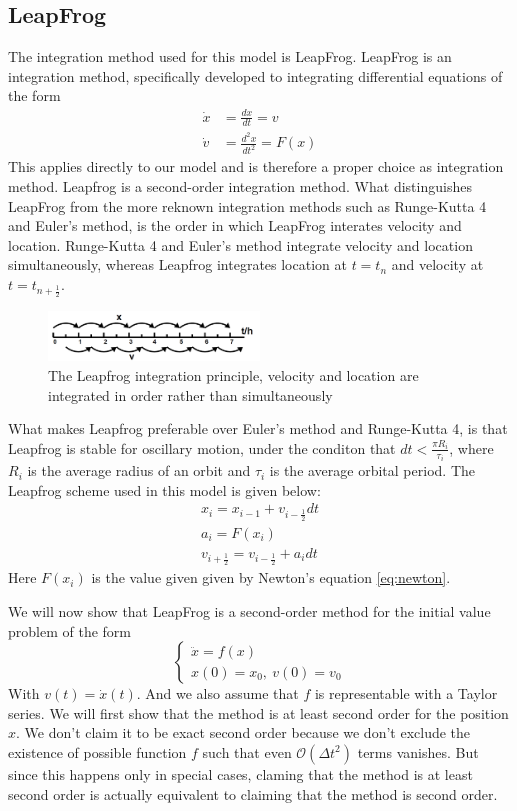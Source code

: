 \subsection{LeapFrog}
The integration method used for this model is LeapFrog. LeapFrog is an integration method, specifically developed to integrating differential equations of the form 
\begin{align*}
	\dot{x}&=\frac{dx}{dt}=v\\
	\dot{v}&=\frac{d^2x}{dt^2}=F(x)
\end{align*}
This applies directly to our model and is therefore a proper choice as integration method. Leapfrog is a second-order integration method. 
What distinguishes LeapFrog from the more reknown integration methods such as Runge-Kutta 4 and Euler's method, is the order in which LeapFrog interates velocity and location. 
Runge-Kutta 4 and Euler's method integrate velocity and location simultaneously, whereas Leapfrog integrates location at \(t=t_n\) and velocity at \(t=t_{n+\frac{1}{2}}\). 
\begin{figure}[H]
  \centering
  \includegraphics[width=0.5\textwidth]{Leapfrog}
  \caption{The Leapfrog integration principle, velocity and location are integrated in order rather than simultaneously}
  \label{fig:leapfrog}
\end{figure}
What makes Leapfrog preferable over Euler's method and Runge-Kutta 4, is that Leapfrog is stable for oscillary motion, under the conditon that \(dt<\frac{\pi R_i}{\tau_i}\), where \(R_i\) is the average radius of an orbit and \(\tau_i\) is the average orbital period\cite{StabLeapfrog}. 
The Leapfrog scheme used in this model is given below:
\begin{align*}
x_i = x_{i-1}+v_{i-\frac{1}{2}} dt\\
a_i= F(x_i)\\
v_{i+\frac{1}{2}}=v_{i-\frac{1}{2}}+ a_idt
\end{align*}
Here \(F(x_i)\) is the value given given by Newton's equation \eqref{eq:newton}.
 
We will now show that LeapFrog is a second-order method for the initial value problem of the form
\[\begin{cases}
	\ddot{x}=f(x)\\
	x(0)=x_0,~v(0)=v_0
\end{cases}\]
With $v(t)=\dot{x}(t)$. And we also assume that $f$ is representable with a Taylor series. 
We will first show that the method is at least second order for the position $x$. We don't claim it to be exact second order because we don't exclude the existence of possible function $f$ such that even $\mathcal{O}(\Delta t^2)$ terms vanishes. But since this happens only in special cases, claming that the method is at least second order is actually equivalent to claiming that the method is second order.\\

